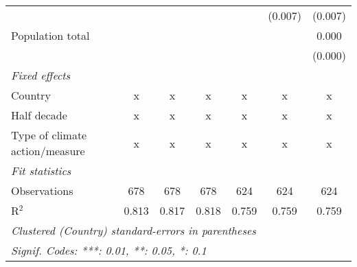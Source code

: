\begin{tabular}{lcccccc}
                                                       &              &               &               &               & (0.007)       & (0.007)\\   
   Population total                                    &              &               &               &               &               & 0.000\\   
                                                       &              &               &               &               &               & (0.000)\\   
   \emph{Fixed effects}\\
   Country                                             & x            & x             & x             & x             & x             & x\\  
   Half decade                                         & x            & x             & x             & x             & x             & x\\  
   Type of climate action/measure                      & x            & x             & x             & x             & x             & x\\  
   \midrule \emph{Fit statistics}\\
   Observations                                        & 678          & 678           & 678           & 624           & 624           & 624\\  
   R$^2$                                               & 0.813        & 0.817         & 0.818         & 0.759         & 0.759         & 0.759\\  
   \midrule
   \multicolumn{7}{l}{\emph{Clustered (Country) standard-errors in parentheses}}\\
   \multicolumn{7}{l}{\emph{Signif. Codes: ***: 0.01, **: 0.05, *: 0.1}}\\
\end{tabular}
\par\endgroup



